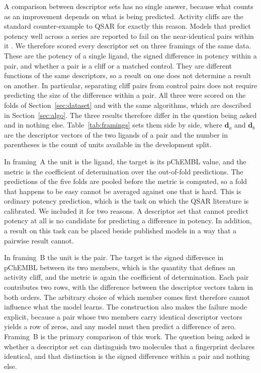 A comparison between descriptor sets has no single answer, because what counts as an
improvement depends on what is being predicted. Activity cliffs are the standard
counter-example to QSAR for exactly this reason. Models that predict potency well
across a series are reported to fail on the near-identical pairs within it
\citep{vantilborg2022, dablander2023}. We therefore scored every descriptor set on
three framings of the same data. These are the potency of a single ligand, the signed
difference in potency within a pair, and whether a pair is a cliff or a matched
control. They are different functions of the same descriptors, so a result on one does
not determine a result on another. In particular, separating cliff pairs from control
pairs does not require predicting the size of the difference within a pair. All three
were scored on the folds of Section~\ref{sec:dataset} and with the same algorithms,
which are described in Section~\ref{sec:algo}. The three results therefore differ in
the question being asked and in nothing else. Table~\ref{tab:framings} sets them side
by side, where $\mathbf{d}_a$ and $\mathbf{d}_b$ are the descriptor vectors of the two
ligands of a pair and the number in parentheses is the count of units available in the
development split.

\begin{table}[tb]
  \centering
  \small
  \caption{\textbf{The three framings.} The unit of each, the quantity it predicts,
    the features of one row, and the metric.}
  \label{tab:framings}
  
\end{table}

In framing~A the unit is the ligand, the target is its pChEMBL value, and the metric is
the coefficient of determination over the out-of-fold predictions. The predictions of
the five folds are pooled before the metric is computed, so a fold that happens to be
easy cannot be averaged against one that is hard. This is ordinary potency prediction,
which is the task on which the QSAR literature is calibrated. We included it for two
reasons. A descriptor set that cannot predict potency at all is no candidate for
predicting a difference in potency. In addition, a result on this task can be placed
beside published models in a way that a pairwise result cannot.

In framing~B the unit is the pair. The target is the signed difference in pChEMBL
between its two members, which is the quantity that defines an activity cliff, and the
metric is again the coefficient of determination. Each pair contributes two rows, with
the difference between the descriptor vectors taken in both orders. The arbitrary
choice of which member comes first therefore cannot influence what the model learns.
The construction also makes the failure mode explicit, because a pair whose two members
carry identical descriptor vectors yields a row of zeros, and any model must then
predict a difference of zero. Framing~B is the primary comparison of this work. The
question being asked is whether a descriptor set can distinguish two molecules that a
fingerprint declares identical, and that distinction is the signed difference within a
pair and nothing else.

